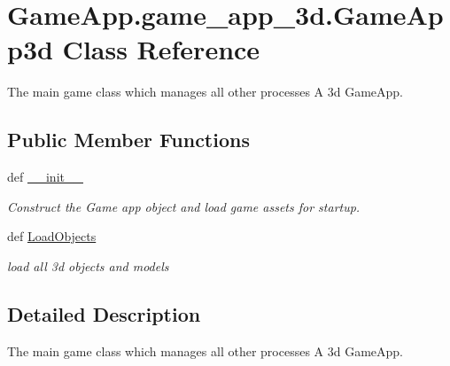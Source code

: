 \hypertarget{classGameApp_1_1game__app__3d_1_1GameApp3d}{
\section{GameApp.game\_\-app\_\-3d.GameApp3d Class Reference}
\label{classGameApp_1_1game__app__3d_1_1GameApp3d}
}
The main game class which manages all other processes  A 3d GameApp.  


\subsection*{Public Member Functions}
\begin{CompactItemize}
\item 
def \hyperlink{classGameApp_1_1game__app__3d_1_1GameApp3d_5b5e3b363668e2ab600a5543e4fe8170}{\_\-\_\-init\_\-\_\-}
\begin{CompactList}\small\item\em Construct the Game app object and load game assets for startup. \item\end{CompactList}\item 
\hypertarget{classGameApp_1_1game__app__3d_1_1GameApp3d_366c111170f35798beda14c71461feda}{
def \hyperlink{classGameApp_1_1game__app__3d_1_1GameApp3d_366c111170f35798beda14c71461feda}{LoadObjects}}
\label{classGameApp_1_1game__app__3d_1_1GameApp3d_366c111170f35798beda14c71461feda}

\begin{CompactList}\small\item\em load all 3d objects and models \item\end{CompactList}\end{CompactItemize}


\subsection{Detailed Description}
The main game class which manages all other processes  A 3d GameApp. 

